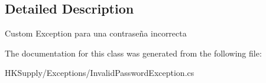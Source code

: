 \subsection{Detailed Description}
Custom Exception para una contraseña incorrecta 



The documentation for this class was generated from the following file\+:\begin{DoxyCompactItemize}
\item 
H\+K\+Supply/\+Exceptions/Invalid\+Password\+Exception.\+cs\end{DoxyCompactItemize}
